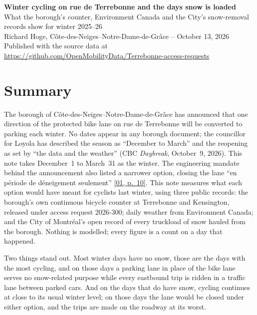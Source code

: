\documentclass[11pt,letterpaper]{article}
\newcommand{\repourl}{https://github.com/OpenMobilityData/Terrebonne-access-requests}
\newcommand{\repo}[1]{\href{\repourl}{#1}}
\newcommand{\pagesurl}{https://openmobilitydata.github.io/Terrebonne-access-requests}
\newcommand{\pgl}[3]{\href{\pagesurl/\csname bundle#1\endcsname\#page=#2}{\textsf{\small[#1, p.~#3]}}}
\newcommand{\pg}[2]{\pgl{#1}{#2}{#2}}
\begin{document}
\begin{center}
{\Large\bfseries Winter cycling on rue de Terrebonne and the days snow is loaded}\\[0.4em]
{\large What the borough's counter, Environment Canada and the City's snow-removal records show for winter 2025--26}\\[0.6em]
Richard Hoge, C\^ote-des-Neiges--Notre-Dame-de-Gr\^ace -- October 13, 2026\\
Published with the source data at \repo{\repourl}
\end{center}

\section*{Summary}

The borough of C\^ote-des-Neiges--Notre-Dame-de-Gr\^ace has announced that
one direction of the protected bike lane on rue de Terrebonne will be
converted to parking each winter. No dates appear in any borough document;
the councillor for Loyola has described the season as ``December to
March'' and the reopening as set by ``the data and the weather'' (CBC
\emph{Daybreak}, October~9, 2026). This note takes December~1 to March~31
as the winter. The engineering
mandate behind the announcement also listed a narrower option, closing the
lane ``en p\'eriode de d\'eneigement seulement'' \pg{01}{10}. This note
measures what each option would have meant for cyclists last winter, using
three public records: the borough's own continuous bicycle counter at
Terrebonne and Kensington, released under access request 2026-300; daily
weather from Environment Canada; and the City of Montr\'eal's open record of
every truckload of snow hauled from the borough. Nothing is modelled; every
figure is a count on a day that happened.

Two things stand out. Most winter days have no snow, those are the days
with the most cycling, and on those days a parking lane in place of the
bike lane serves no snow-related purpose while every eastbound trip is
ridden in a traffic lane between parked cars. And on the days that do have
snow, cycling continues at close to its usual winter level; on those days
the lane would be closed under either option, and the trips are made on
the roadway at its worst.
\end{document}
